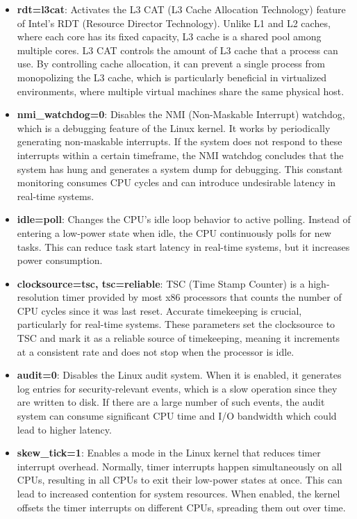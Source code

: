 \documentclass[MMR,Master,english]{twbook}
\begin{document}
\begin{itemize}
	\item \textbf{rdt=l3cat}: Activates the L3 CAT (L3 Cache Allocation Technology) feature of Intel’s RDT (Resource Director Technology). Unlike L1 and L2 caches, where each core has its fixed capacity, L3 cache is a shared pool among multiple cores. L3 CAT controls the amount of L3 cache that a process can use. By controlling cache allocation, it can prevent a single process from monopolizing the L3 cache, which is particularly beneficial in virtualized environments, where multiple virtual machines share the same physical host.
	\item \textbf{nmi\_watchdog=0}: Disables the NMI (Non-Maskable Interrupt) watchdog, which is a debugging feature of the Linux kernel. It works by periodically generating non-maskable interrupts. If the system does not respond to these interrupts within a certain timeframe, the NMI watchdog concludes that the system has hung and generates a system dump for debugging.  This constant monitoring consumes CPU cycles and can introduce undesirable latency in real-time systems.
	\item \textbf{idle=poll}: Changes the CPU’s idle loop behavior to active polling. Instead of entering a low-power state when idle, the CPU continuously polls for new tasks. This can reduce task start latency in real-time systems, but it increases power consumption.
	\item \textbf{clocksource=tsc, tsc=reliable}: TSC (Time Stamp Counter) is a high-resolution timer provided by most x86 processors that counts the number of CPU cycles since it was last reset. Accurate timekeeping is crucial, particularly for real-time systems. These parameters set the clocksource to TSC and mark it as a reliable source of timekeeping, meaning it increments at a consistent rate and does not stop when the processor is idle.
	\item \textbf{audit=0}: Disables the Linux audit system. When it is enabled, it generates log entries for security-relevant events, which is a slow operation since they are written to disk. If there are a large number of such events, the audit system can consume significant CPU time and I/O bandwidth which could lead to higher latency.
	\item \textbf{skew\_tick=1}: Enables a mode in the Linux kernel that reduces timer interrupt overhead. Normally, timer interrupts happen simultaneously on all CPUs, resulting in all CPUs to exit their low-power states at once. This can lead to increased contention for system resources. When enabled, the kernel offsets the timer interrupts on different CPUs, spreading them out over time.

\end{itemize}
\end{document}
